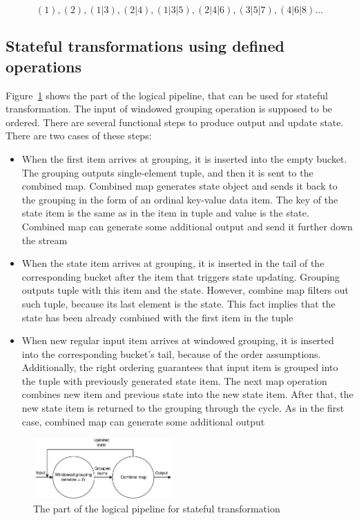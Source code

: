 \[(1), (2), (1|3), (2|4), (1|3|5), (2|4|6), (3|5|7), (4|6|8)...\]

\subsection{Stateful transformations using defined operations}
Figure~\ref{stateful-schema} shows the part of the logical pipeline, that can be used for stateful transformation. The input of windowed grouping operation is supposed to be ordered. There are several functional steps to produce output and update state. There are two cases of these steps:

\begin{itemize}
    \item When the first item arrives at grouping, it is inserted into the empty bucket. The grouping outputs single-element tuple, and then it is sent to the combined map. Combined map generates state object and sends it back to the grouping in the form of an ordinal key-value data item. The key of the state item is the same as in the item in tuple and value is the state. Combined map can generate some additional output and send it further down the stream
    \item When the state item arrives at grouping, it is inserted in the tail of the corresponding bucket after the item that triggers state updating. Grouping outputs tuple with this item and the state. However, combine map filters out such tuple, because its last element is the state. This fact implies that the state has been already combined with the first item in the tuple
    \item When new regular input item arrives at windowed grouping, it is inserted into the corresponding bucket's tail, because of the order assumptions. Additionally, the right ordering guarantees that input item is grouped into the tuple with previously generated state item. The next map operation combines new item and previous state into the new state item. After that, the new state item is returned to the grouping through the cycle. As in the first case, combined map can generate some additional output
\end{itemize}


\begin{figure}[htbp]
  \centering
  \includegraphics[width=0.48\textwidth]{pics/stateful-schema}
  \caption{The part of the logical pipeline for stateful transformation}
  \label {stateful-schema}
\end{figure}

